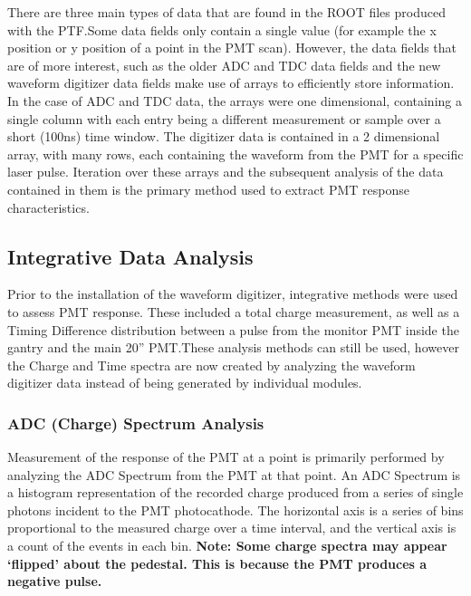 \documentclass[twoside,letterpaper]{refart}
\begin{document}
There are three main types of data that are found in the ROOT files produced with the PTF.\@ Some data fields only contain a single value (for example the x position or y position of a point in the PMT scan). However, the data fields that are of more interest, such as the older ADC and TDC data fields and the new waveform digitizer data fields make use of arrays to efficiently store information. In the case of ADC and TDC data, the arrays were one dimensional, containing a single column with each entry being a different measurement or sample over a short (100ns) time window. The digitizer data is contained in a 2 dimensional array, with many rows, each containing the waveform from the PMT for a specific laser pulse. Iteration over these arrays and the subsequent analysis of the data contained in them is the primary method used to extract PMT response characteristics.

\subsection{Integrative Data Analysis}

Prior to the installation of the waveform digitizer, integrative methods were used to assess PMT response. These included a total charge measurement, as well as a Timing Difference distribution between a pulse from the monitor PMT inside the gantry and the main 20'' PMT.\@ These analysis methods can still be used, however the Charge and Time spectra are now created by analyzing the waveform digitizer data instead of being generated by individual modules.

\subsubsection{ADC (Charge) Spectrum Analysis}

Measurement of the response of the PMT at a point is primarily performed by analyzing the ADC Spectrum from the PMT at that point. An ADC Spectrum is a histogram representation of the recorded charge produced from a series of single photons incident to the PMT photocathode. The horizontal axis is a series of bins proportional to the measured charge over a time interval, and the vertical axis is a count of the events in each bin. \textbf{Note: Some charge spectra may appear `flipped' about the pedestal. This is because the PMT produces a negative pulse.}

\FloatBarrier
\end{document}
